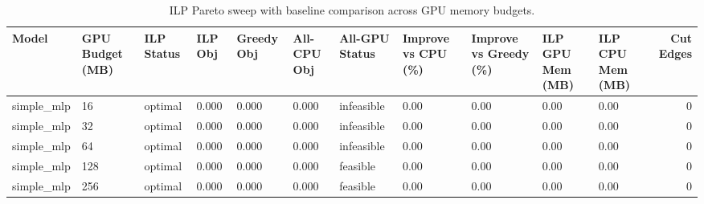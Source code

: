 \begin{table}[t]
\centering
\caption{ILP Pareto sweep with baseline comparison across GPU memory budgets.}
\label{tab:ilp-budget-sweep}
\begin{tabular}{lllllllllllr}
\toprule
Model & GPU Budget (MB) & ILP Status & ILP Obj & Greedy Obj & All-CPU Obj & All-GPU Status & Improve vs CPU (\%) & Improve vs Greedy (\%) & ILP GPU Mem (MB) & ILP CPU Mem (MB) & Cut Edges \\
\midrule
simple_mlp & 16 & optimal & 0.000 & 0.000 & 0.000 & infeasible & 0.00 & 0.00 & 0.00 & 0.00 & 0 \\
simple_mlp & 32 & optimal & 0.000 & 0.000 & 0.000 & infeasible & 0.00 & 0.00 & 0.00 & 0.00 & 0 \\
simple_mlp & 64 & optimal & 0.000 & 0.000 & 0.000 & infeasible & 0.00 & 0.00 & 0.00 & 0.00 & 0 \\
simple_mlp & 128 & optimal & 0.000 & 0.000 & 0.000 & feasible & 0.00 & 0.00 & 0.00 & 0.00 & 0 \\
simple_mlp & 256 & optimal & 0.000 & 0.000 & 0.000 & feasible & 0.00 & 0.00 & 0.00 & 0.00 & 0 \\
\bottomrule
\end{tabular}

\end{table}
